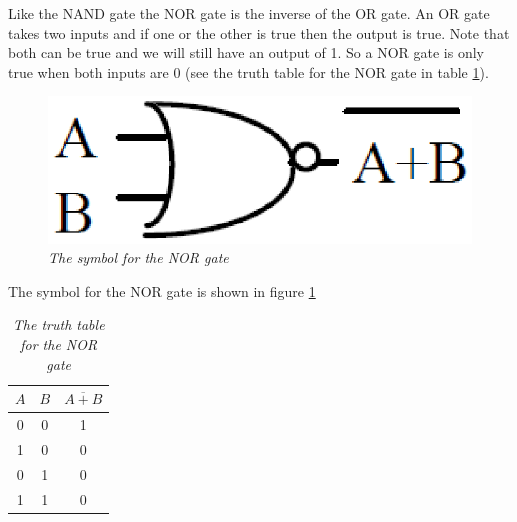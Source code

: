\documentclass[11pt]{article}
\numberwithin{equation}{section}
\numberwithin{figure}{section}
\numberwithin{table}{section}
\begin{document}
Like the NAND gate the NOR gate is the inverse of the OR gate. An OR gate takes two inputs and if one or the other is true then the output is true. Note that both can be true and we will still have an output of 1. So a NOR gate is only true when both inputs are 0 (see the truth table for the NOR gate in table \ref{TruthTabNOR}). 
\begin{figure}[h]
\centering
\includegraphics[scale=0.50]{FigNOR.eps}
\caption{\textit{The symbol for the NOR gate}}
\label{FigNOR}
\end{figure}
The symbol for the NOR gate is shown in figure \ref{FigNOR}
\begin{table}[h]
\centering
\begin{tabular}{cc|c}
$A$	&$B$	&$\overline{A+B}$\\
\hline
0	&0	&1\\
1	&0	&0\\
0	&1	&0\\
1	&1	&0\\
\end{tabular}
\caption{\textit{The truth table for the NOR gate}}
\label{TruthTabNOR}
\end{table}
\end{document}
